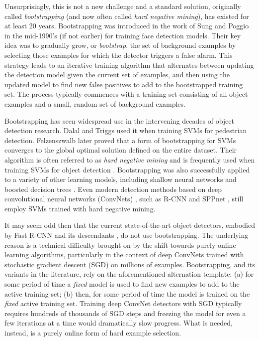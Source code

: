 \documentclass[10pt,twocolumn,letterpaper]{article}
\begin{document}
Unsurprisingly, this is not a new challenge and a standard solution, originally called \emph{bootstrapping} (and now often called \emph{hard negative mining}), has existed for at least 20 years. Bootstrapping was introduced in the work of Sung and Poggio \cite{sungThesis} in the mid-1990's (if not earlier) for training face detection models. Their key idea was to gradually grow, or \emph{bootstrap}, the set of background examples by selecting those examples for which the detector triggers a false alarm. This strategy leads to an iterative training algorithm that alternates between updating the detection model given the current set of examples, and then using the updated model to find new false positives to add to the bootstrapped training set. The process typically commences with a training set consisting of all object examples and a small, random set of background examples.

Bootstrapping has seen widespread use in the intervening decades of object detection research. Dalal and Triggs \cite{DalalTriggs} used it when training SVMs for pedestrian detection. Felzenszwalb \etal \cite{dpm} later proved that a form of bootstrapping for SVMs converges to the global optimal solution defined on the entire dataset. Their algorithm is often referred to as \emph{hard negative mining} and is frequently used when training SVMs for object detection \cite{Uijlings13,rcnn,SPPnet}. Bootstrapping was also successfully applied to a variety of other learning models, including shallow neural networks \cite{rowley1998neural} and boosted decision trees \cite{dollar}. Even modern detection methods based on deep convolutional neural networks (ConvNets) \cite{backprop,AlexNet}, such as R-CNN \cite{rcnn} and SPPnet \cite{SPPnet}, still employ SVMs trained with hard negative mining.

It may seem odd then that the current state-of-the-art object detectors, embodied by Fast R-CNN \cite{frcn} and its descendants \cite{ren2015faster}, do not use bootstrapping. The underlying reason is a technical difficulty brought on by the shift towards purely online learning algorithms, particularly in the context of deep ConvNets trained with stochastic gradient descent (SGD) on millions of examples. Bootstrapping, and its variants in the literature, rely on the aforementioned alternation template: (a) for some period of time a \emph{fixed} model is used to find new examples to add to the active training set; (b) then, for some period of time the model is trained on the \emph{fixed} active training set. Training deep ConvNet detectors with SGD typically requires hundreds of thousands of SGD steps and freezing the model for even a few iterations at a time would dramatically slow progress. What is needed, instead, is a purely online form of hard example selection.
\end{document}
